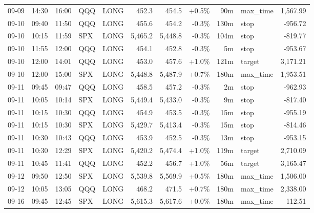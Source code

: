 \documentclass[11pt,a4paper,twoside]{article}
\begin{document}
\begin{center}
\begin{longtable}{>{\color{txtmain}}l l l l l r r r r >{\color{txtmain}}l r}
09-09 & 14:30 & 16:00 & QQQ & LONG & 452.3 & 454.5 & \textcolor{wingreen}{+0.5\%} & 90m & max\_time & \textcolor{wingreen}{1,567.99} \\
09-10 & 09:40 & 11:50 & QQQ & LONG & 455.6 & 454.2 & \textcolor{lossred}{-0.3\%} & 130m & stop & \textcolor{lossred}{-956.72} \\
09-10 & 10:15 & 11:59 & SPX & LONG & 5,465.2 & 5,448.8 & \textcolor{lossred}{-0.3\%} & 104m & stop & \textcolor{lossred}{-819.77} \\
09-10 & 11:55 & 12:00 & QQQ & LONG & 454.1 & 452.8 & \textcolor{lossred}{-0.3\%} & 5m & stop & \textcolor{lossred}{-953.67} \\
09-10 & 12:00 & 14:01 & QQQ & LONG & 453.0 & 457.6 & \textcolor{wingreen}{+1.0\%} & 121m & target & \textcolor{wingreen}{3,171.21} \\
09-10 & 12:00 & 15:00 & SPX & LONG & 5,448.8 & 5,487.9 & \textcolor{wingreen}{+0.7\%} & 180m & max\_time & \textcolor{wingreen}{1,953.51} \\
09-11 & 09:45 & 09:47 & QQQ & LONG & 458.5 & 457.2 & \textcolor{lossred}{-0.3\%} & 2m & stop & \textcolor{lossred}{-962.93} \\
09-11 & 10:05 & 10:14 & SPX & LONG & 5,449.4 & 5,433.0 & \textcolor{lossred}{-0.3\%} & 9m & stop & \textcolor{lossred}{-817.40} \\
09-11 & 10:15 & 10:30 & QQQ & LONG & 454.9 & 453.5 & \textcolor{lossred}{-0.3\%} & 15m & stop & \textcolor{lossred}{-955.19} \\
09-11 & 10:15 & 10:30 & SPX & LONG & 5,429.7 & 5,413.4 & \textcolor{lossred}{-0.3\%} & 15m & stop & \textcolor{lossred}{-814.46} \\
09-11 & 10:30 & 10:43 & QQQ & LONG & 453.9 & 452.5 & \textcolor{lossred}{-0.3\%} & 13m & stop & \textcolor{lossred}{-953.15} \\
09-11 & 10:30 & 12:29 & SPX & LONG & 5,420.2 & 5,474.4 & \textcolor{wingreen}{+1.0\%} & 119m & target & \textcolor{wingreen}{2,710.09} \\
09-11 & 10:45 & 11:41 & QQQ & LONG & 452.2 & 456.7 & \textcolor{wingreen}{+1.0\%} & 56m & target & \textcolor{wingreen}{3,165.47} \\
09-12 & 09:50 & 12:50 & SPX & LONG & 5,539.8 & 5,569.9 & \textcolor{wingreen}{+0.5\%} & 180m & max\_time & \textcolor{wingreen}{1,506.00} \\
09-12 & 10:05 & 13:05 & QQQ & LONG & 468.2 & 471.5 & \textcolor{wingreen}{+0.7\%} & 180m & max\_time & \textcolor{wingreen}{2,338.00} \\
09-16 & 09:45 & 12:45 & SPX & LONG & 5,615.3 & 5,617.6 & \textcolor{wingreen}{+0.0\%} & 180m & max\_time & \textcolor{wingreen}{112.51} \\

\end{longtable}
\end{center}
\end{document}
